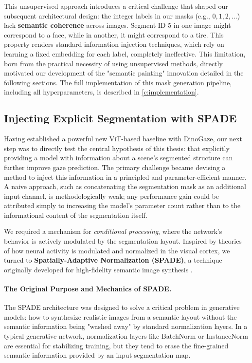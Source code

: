 This unsupervised approach introduces a critical challenge that shaped our subsequent architectural design: the integer labels in our masks (e.g., $0, 1, 2, \ldots$) lack \textbf{semantic coherence} across images. Segment ID 5 in one image might correspond to a face, while in another, it might correspond to a tire. This property renders standard information injection techniques, which rely on learning a fixed embedding for each label, completely ineffective. This limitation, born from the practical necessity of using unsupervised methods, directly motivated our development of the "semantic painting" innovation detailed in the following sections. The full implementation of this mask generation pipeline, including all hyperparameters, is described in \cref{c:implementation}.

\subsection{Injecting Explicit Segmentation with SPADE}
\label{sec:method_spade_rationale}

Having established a powerful new ViT-based baseline with DinoGaze, our next step was to directly test the central hypothesis of this thesis: that explicitly providing a model with information about a scene's segmented structure can further improve gaze prediction. The primary challenge became devising a method to inject this information in a principled and parameter-efficient manner. A naive approach, such as concatenating the segmentation mask as an additional input channel, is methodologically weak; any performance gain could be attributed simply to increasing the model's parameter count rather than to the informational content of the segmentation itself.

We required a mechanism for \textit{conditional processing}, where the network's behavior is actively modulated by the segmentation layout. Inspired by theories of how neural activity is modulated and normalized in the visual cortex, we turned to \textbf{Spatially-Adaptive Normalization (SPADE)}, a technique originally developed for high-fidelity semantic image synthesis \cite{park2019SPADE}.

\paragraph{The Original Purpose and Mechanics of SPADE.}
The SPADE architecture was designed to solve a critical problem in generative models: how to synthesize realistic images from a semantic layout without the semantic information being "washed away" by standard normalization layers. In a typical generative network, normalization layers like BatchNorm or InstanceNorm are essential for stabilizing training, but they tend to erase the fine-grained semantic information provided by an input segmentation map.


